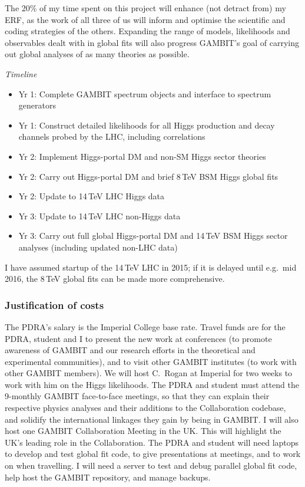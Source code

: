 \documentclass[11pt,oneside,twocolumn,a4paper]{article}
\begin{document}
The 20\% of my time spent on this project will enhance (not detract from) my ERF, as the work of all three of us will inform and optimise the scientific and coding strategies of the others.  Expanding the range of models, likelihoods and observables dealt with in global fits will also progress GAMBIT's goal of carrying out global analyses of as many theories as possible.

\medskip\noindent\textit{Timeline}
\begin{itemize}\setlength{\itemsep}{2pt}
\item Yr 1: Complete GAMBIT spectrum objects and interface to spectrum generators
\item Yr 1: Construct detailed likelihoods for all Higgs production and decay channels probed by the LHC, including correlations
\item Yr 2: Implement Higgs-portal DM and non-SM Higgs sector theories
\item Yr 2: Carry out Higgs-portal DM and brief 8\,TeV BSM Higgs global fits
\item Yr 2: Update to 14\,TeV LHC Higgs data
\item Yr 3: Update to 14\,TeV LHC non-Higgs data
\item Yr 3: Carry out full global Higgs-portal DM and 14\,TeV BSM Higgs sector analyses (including updated non-LHC data) 
\end{itemize}\vspace{1mm}

I have assumed startup of the 14\,TeV LHC in 2015; if it is delayed until e.g.\ mid 2016, the 8\,TeV global fits can be made more comprehensive.


\subsubsection*{Justification of costs}

The PDRA's salary is the Imperial College base rate.  Travel funds are for the PDRA, student and I to present the new work at conferences (to promote awareness of GAMBIT and our research efforts in the theoretical and experimental communities), and to visit other GAMBIT institutes (to work with other GAMBIT members).  We will host C.\ Rogan at Imperial for two weeks to work with him on the Higgs likelihoods.  The PDRA and student must attend the 9-monthly GAMBIT face-to-face meetings, so that they can explain their respective physics analyses and their additions to the Collaboration codebase, and solidify the international linkages they gain by being in GAMBIT.  I will also host one GAMBIT Collaboration Meeting in the UK.  This will highlight the UK's leading role in the Collaboration.  The PDRA and student will need laptops to develop and test global fit code, to give presentations at meetings, and to work on when travelling.  I will need a server to test and debug parallel global fit code, help host the GAMBIT repository, and manage backups.
\end{document}
